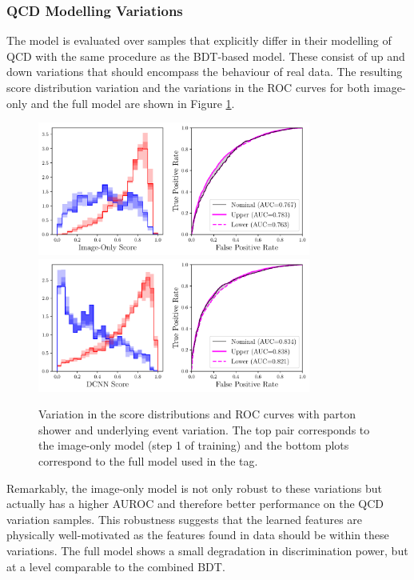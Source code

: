 \subsubsection{QCD Modelling Variations}
The model is evaluated over samples that explicitly differ in their modelling of QCD with the same procedure as the BDT-based model.
These consist of up and down variations that should encompass the behaviour of real data.
The resulting score distribution variation and the variations in the ROC curves for both image-only and the full model are shown in Figure \ref{fig:event_categorisation:DCNN_psvar}.
\begin{figure}[h!]
    \centering
    \includegraphics[width=0.80\textwidth]{figures/event_selection/imgonly_PSvar_PS.pdf}
    \includegraphics[width=0.80\textwidth]{figures/event_selection/int_PSvar_PS.pdf}
    \caption{Variation in the score distributions and ROC curves with parton shower and underlying event variation. The top pair corresponds to the image-only model (step 1 of training) and the bottom plots correspond to the full model used in the tag.}
    \label{fig:event_categorisation:DCNN_psvar}
\end{figure}

Remarkably, the image-only model is not only robust to these variations but actually has a higher AUROC and therefore better performance on the QCD variation samples.
This robustness suggests that the learned features are physically well-motivated as the features found in data should be within these variations.
The full model shows a small degradation in discrimination power, but at a level comparable to the combined BDT. 

